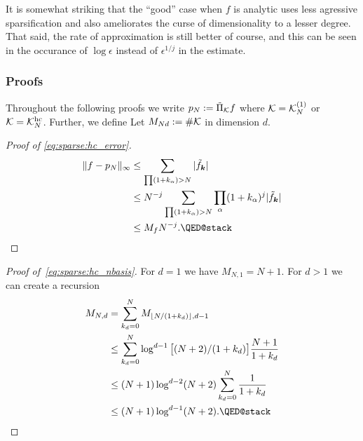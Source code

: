 
It is somewhat striking that the ``good'' case when $f$ is analytic uses less
agressive sparsification and also ameliorates the curse of dimensionality to a
lesser degree. That said, the rate of approximation is still better of course, 
and this can be seen in the occurance of $\log \epsilon$ instead of 
$\epsilon^{1/j}$ in the estimate.

\subsubsection{Proofs}

Throughout the following proofs we write $p_N := \tilde\Pi_{\mathcal{K}}f$ where
$\mathcal{K} = \mathcal{K}_N^{(1)}$ or $\mathcal{K} = \mathcal{K}_N^{\rm hc}$. Further, we define Let
$M_{Nd} := \#\mathcal{K}$ in dimension $d$.

\begin{proof}[Proof of \eqref{eq:sparse:hc_error}]
    \begin{align*}
        \|f - p_N\|_\infty
        &\leq 
        \sum_{\prod (1+k_\alpha)>N} |\tilde{f}_\bk| \\ 
        &\leq
        N^{-j} 
        \sum_{\prod (1+k_\alpha)>N}  \prod_\alpha (1+k_\alpha)^j |\tilde{f}_\bk| \\ 
        &\leq 
        M_f N^{-j}. \qedhere 
    \end{align*}
\end{proof}

\begin{proof}[Proof of~\eqref{eq:sparse:hc_nbasis}]
    For $d = 1$ we have $M_{N,1} = N+1$. For $d > 1$ we can create a 
    recursion 
    \begin{align*}
        M_{N,d} 
        &= \sum_{k_{d} = 0}^N M_{\lfloor N/(1+k_d) \rfloor, d-1} \\ 
        &\leq \sum_{k_d = 0}^N \log^{d-1} \b[ (N+2)/(1+k_d) \b] \frac{N+1}{1+k_d} \\ 
        &\leq (N+1) \log^{d-2} (N+2) \sum_{k_d = 0}^N \frac{1}{1+k_d} \\ 
        &\leq (N+1) \log^{d-1} (N+2).  \qedhere 
    \end{align*}
\end{proof}

